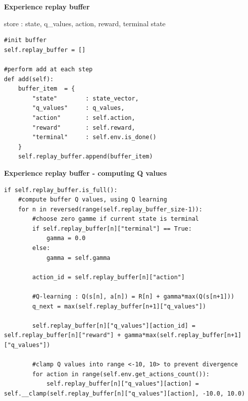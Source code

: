 \documentclass[xcolor=dvipsnames]{beamer}
\begin{document}
\begin{frame}[fragile]
{\bf Experience replay buffer}

store : state, q\_values, action, reward, terminal state

\begin{lstlisting}
#init buffer
self.replay_buffer = []

#perform add at each step
def add(self):
    buffer_item  = {
        "state"        : state_vector,
        "q_values"     : q_values,
        "action"       : self.action,
        "reward"       : self.reward,
        "terminal"     : self.env.is_done()
    }
    self.replay_buffer.append(buffer_item)
\end{lstlisting}

\end{frame}




\begin{frame}[fragile]
{\bf Experience replay buffer - computing Q values}

\begin{lstlisting}
if self.replay_buffer.is_full():
    #compute buffer Q values, using Q learning
    for n in reversed(range(self.replay_buffer_size-1)):
        #choose zero gamme if current state is terminal
        if self.replay_buffer[n]["terminal"] == True:
            gamma = 0.0
        else:
            gamma = self.gamma

        action_id = self.replay_buffer[n]["action"]

        #Q-learning : Q(s[n], a[n]) = R[n] + gamma*max(Q(s[n+1]))
        q_next = max(self.replay_buffer[n+1]["q_values"])

        self.replay_buffer[n]["q_values"][action_id] = self.replay_buffer[n]["reward"] + gamma*max(self.replay_buffer[n+1]["q_values"])

        #clamp Q values into range <-10, 10> to prevent divergence
        for action in range(self.env.get_actions_count()):
            self.replay_buffer[n]["q_values"][action] = self.__clamp(self.replay_buffer[n]["q_values"][action], -10.0, 10.0)
\end{lstlisting}


\end{frame}
\end{document}
